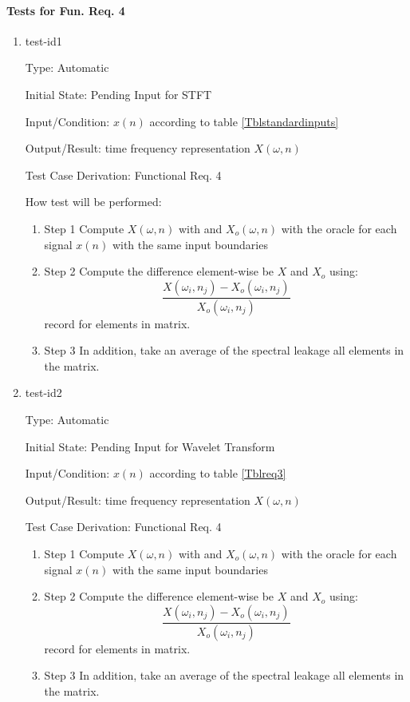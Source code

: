 \documentclass[12pt, titlepage]{article}
\begin{document}
\paragraph{Tests for Fun. Req. 4}

\begin{enumerate}

\item{test-id1\\}

Type: Automatic
					
Initial State: Pending Input for STFT
					
Input/Condition: $x(n)$ according to table \ref{Tblstandardinputs}
					
Output/Result: time frequency representation $X(\omega, n)$
	
Test Case Derivation: Functional Req. 4			
					
How test will be performed: 
\begin{enumerate}

\item{Step 1} Compute $X(\omega, n)$ with \progname and $X_o(\omega, n)$ with the oracle for each signal $x(n)$ with the same input boundaries
\item{Step 2} Compute the difference element-wise be $X$ and $X_o$ using:
\[ \frac{X(\omega_i, n_j) - X_o(\omega_i, n_j)}{X_o(\omega_i, n_j)} \]
record for elements in matrix.
\item{Step 3} In addition, take an average of the spectral leakage all elements in the matrix.
\end{enumerate}			

\item{test-id2\\}

Type: Automatic
					
Initial State: Pending Input for Wavelet Transform
					
Input/Condition: $x(n)$ according to table \ref{Tblreq3}
					
Output/Result: time frequency representation $X(\omega, n)$
	
Test Case Derivation: Functional Req. 4			
					
\begin{enumerate}

\item{Step 1} Compute $X(\omega, n)$ with \progname and $X_o(\omega, n)$ with the oracle for each signal $x(n)$ with the same input boundaries
\item{Step 2} Compute the difference element-wise be $X$ and $X_o$ using:
\[ \frac{X(\omega_i, n_j) - X_o(\omega_i, n_j)}{X_o(\omega_i, n_j)} \]
record for elements in matrix.
\item{Step 3} In addition, take an average of the spectral leakage all elements in the matrix.
\end{enumerate}	
					

\end{enumerate}
\end{document}

